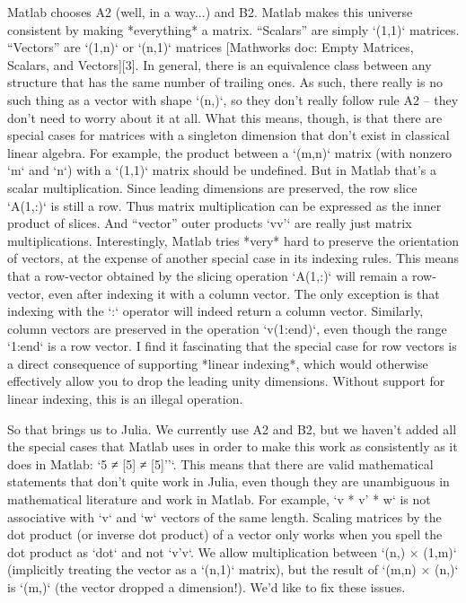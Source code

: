 Matlab chooses A2 (well, in a way...) and B2. Matlab makes this universe
consistent by making *everything* a matrix. ``Scalars'' are simply `(1,1)`
matrices. ``Vectors'' are `(1,n)` or `(n,1)` matrices [Mathworks doc: Empty
Matrices, Scalars, and Vectors][3]. In general, there is an equivalence class
between any structure that has the same number of trailing ones. As such, there
really is no such thing as a vector with shape `(n,)`, so they don't really
follow rule A2 -- they don't need to worry about it at all. What this means,
though, is that there are special cases for matrices with a singleton dimension
that don't exist in classical linear algebra. For example, the product between
a `(m,n)` matrix (with nonzero `m` and `n`) with a `(1,1)` matrix should be
undefined. But in Matlab that's a scalar multiplication. Since leading
dimensions are preserved, the row slice `A(1,:)` is still a row. Thus matrix
multiplication can be expressed as the inner product of slices. And ``vector''
outer products `vv'` are really just matrix multiplications. Interestingly,
Matlab tries *very* hard to preserve the orientation of vectors, at the expense
of another special case in its indexing rules. This means that a row-vector
obtained by the slicing operation `A(1,:)` will remain a row-vector, even after
indexing it with a column vector. The only exception is that indexing with the
`:` operator will indeed return a column vector. Similarly, column vectors are
preserved in the operation `v(1:end)`, even though the range `1:end` is a row
vector. I find it fascinating that the special case for row vectors is a direct
consequence of supporting *linear indexing*, which would otherwise effectively
allow you to drop the leading unity dimensions. Without support for linear
indexing, this is an illegal operation.

So that brings us to Julia. We currently use A2 and B2, but we haven't added
all the special cases that Matlab uses in order to make this work as
consistently as it does in Matlab: `5 ≠ [5] ≠ [5]''`. This means that there are
valid mathematical statements that don't quite work in Julia, even though they
are unambiguous in mathematical literature and work in Matlab. For example,
`v * v' * w` is not associative with `v` and `w` vectors of the same length.
Scaling matrices by the dot product (or inverse dot product) of a vector only
works when you spell the dot product as `dot` and not `v'v`. We allow
multiplication between `(n,) × (1,m)` (implicitly treating the vector as a
`(n,1)` matrix), but the result of `(m,n) × (n,)` is `(m,)` (the vector dropped
a dimension!). We'd like to fix these issues.

